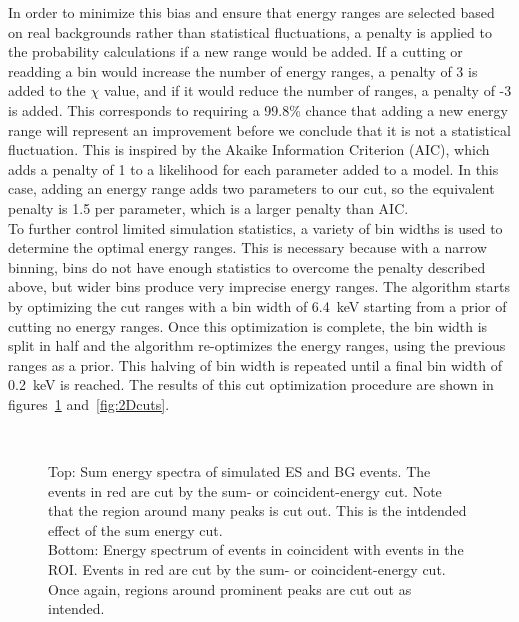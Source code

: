 \documentclass[/main.tex]{subfiles}
\begin{document}
In order to minimize this bias and ensure that energy ranges are selected based on real backgrounds rather than statistical fluctuations, a penalty is applied to the probability calculations if a new range would be added.
If a cutting or readding a bin would increase the number of energy ranges, a penalty of 3 is added to the $\chi$ value, and if it would reduce the number of ranges, a penalty of -3 is added.
This corresponds to requiring a 99.8\% chance that adding a new energy range will represent an improvement before we conclude that it is not a statistical fluctuation.
This is inspired by the Akaike Information Criterion (AIC), which adds a penalty of 1 to a likelihood for each parameter added to a model.
In this case, adding an energy range adds two parameters to our cut, so the equivalent penalty is 1.5 per parameter, which is a larger penalty than AIC.
\\
To further control limited simulation statistics, a variety of bin widths is used to determine the optimal energy ranges.
This is necessary because with a narrow binning, bins do not have enough statistics to overcome the penalty described above, but wider bins produce very imprecise energy ranges.
The algorithm starts by optimizing the cut ranges with a bin width of 6.4~keV starting from a prior of cutting no energy ranges.
Once this optimization is complete, the bin width is split in half and the algorithm re-optimizes the energy ranges, using the previous ranges as a prior.
This halving of bin width is repeated until a final bin width of 0.2~keV is reached.
The results of this cut optimization procedure are shown in figures~\ref{fig:sumandcoinEcuts} and~\ref{fig:2Dcuts}.
\\
\begin{figure}[!h]
  \centering
  \\
  \caption[Sum and coincident simulated energy spectra with cuts]{\label{fig:sumandcoinEcuts}
    Top: Sum energy spectra of simulated ES and BG events. The events in red are cut by the sum- or coincident-energy cut. Note that the region around many peaks is cut out. This is the intdended effect of the sum energy cut.\\
    Bottom: Energy spectrum of events in coincident with events in the ROI. Events in red are cut by the sum- or coincident-energy cut. Once again, regions around prominent peaks are cut out as intended.
  }
\end{figure}
\end{document}
